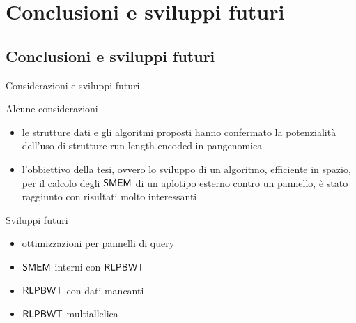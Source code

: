 \documentclass[]{beamer}
\def\KSMEM{\mbox{\rm {\sf K-SMEM}}}
\def\RLPBWT{\mbox{\rm {\sf RLPBWT}}}
\def\SMEM{\mbox{\rm {\sf SMEM}}}
\begin{document}
\section{Conclusioni e sviluppi futuri}
\subsection{Conclusioni e sviluppi futuri}
\begin{frame}{Considerazioni e sviluppi futuri}
  \begin{block}{Alcune considerazioni}
    \small
    \begin{itemize}
      \item le strutture dati e gli algoritmi proposti hanno
      confermato la potenzialità dell'uso di strutture run-length encoded in
      pangenomica
      \item l'obbiettivo della tesi, ovvero lo sviluppo di un algoritmo,
      efficiente in spazio, per il calcolo degli $\SMEM$ di un aplotipo esterno
      contro un pannello, è stato raggiunto con risultati molto interessanti
    \end{itemize}
  \end{block}
  \begin{block}{Sviluppi futuri}
    \small
    \begin{multicols}{2}
      \begin{itemize}
        \item ottimizzazioni per pannelli di query
        \item $\SMEM$ interni con $\RLPBWT$
        \item $\RLPBWT$ con dati mancanti
        \item $\RLPBWT$ multiallelica
      \end{itemize}
    \end{multicols}
  \end{block}
\end{frame}
\end{document}
